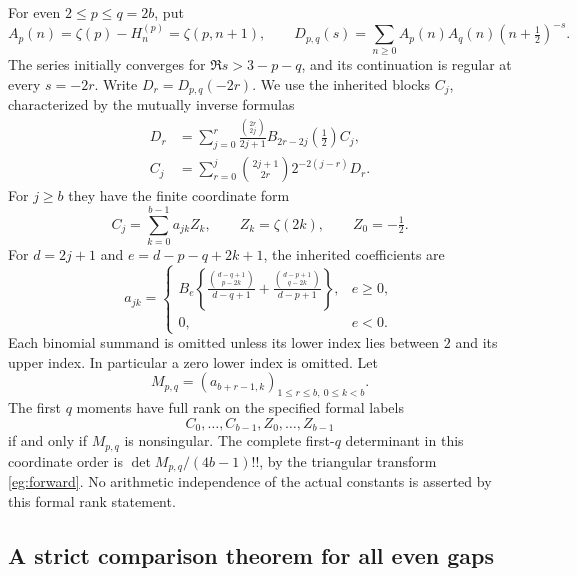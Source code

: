 For even $2\le p\le q=2b$, put
\[
 A_p(n)=\zeta(p)-H_n^{(p)}=\zeta(p,n+1),\qquad
 D_{p,q}(s)=\sum_{n\ge0}A_p(n)A_q(n)(n+\tfrac12)^{-s}.
\]
The series initially converges for $\Re s>3-p-q$, and its continuation
is regular at every $s=-2r$. Write $D_r=D_{p,q}(-2r)$. We use the
inherited blocks $C_j$, characterized by the mutually inverse formulas
\begin{align}
 D_r&=\sum_{j=0}^r\frac{\binom{2r}{2j}}{2j+1}
       B_{2r-2j}(\tfrac12)C_j,\label{eg:forward}\\
 C_j&=\sum_{r=0}^j\binom{2j+1}{2r}2^{-2(j-r)}D_r.
       \label{eg:backward}
\end{align}
For $j\ge b$ they have the finite coordinate form
\[
 C_j=\sum_{k=0}^{b-1}a_{jk}Z_k,\qquad
 Z_k=\zeta(2k),\qquad Z_0=-\tfrac12.
\]
For $d=2j+1$ and $e=d-p-q+2k+1$, the inherited coefficients are
\begin{equation}\label{eg:entries}
 a_{jk}=\begin{cases}
 B_e\left\{\displaystyle
 \frac{\binom{d-q+1}{p-2k}}{d-q+1}
 +\frac{\binom{d-p+1}{q-2k}}{d-p+1}\right\},&e\ge0,\\[6pt]
 0,&e<0.
 \end{cases}
\end{equation}
Each binomial summand is omitted unless its lower index lies between
$2$ and its upper index. In particular a zero lower index is omitted.
Let
\begin{equation}\label{eg:M}
 M_{p,q}=(a_{b+r-1,k})_{1\le r\le b,\ 0\le k<b}.
\end{equation}
The first $q$ moments have full rank on the specified formal labels
\[
 C_0,\ldots,C_{b-1},Z_0,\ldots,Z_{b-1}
\]
if and only if $M_{p,q}$ is nonsingular. The complete first-$q$
determinant in this coordinate order is
$\det M_{p,q}/(4b-1)!!$, by the triangular transform
\eqref{eg:forward}. No arithmetic independence of the actual constants
is asserted by this formal rank statement.

\subsection{A strict comparison theorem for all even gaps}

